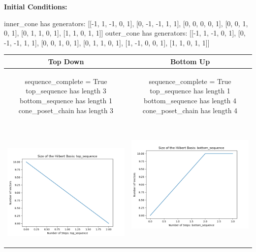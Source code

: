 \documentclass[10pt]{article}
\begin{document}
\textbf{Initial Conditions:}
\begin{SAGE}
inner_cone has generators: 
[[-1, 1, -1, 0, 1], [0, -1, -1, 1, 1], [0, 0, 0, 0, 1], [0, 0, 1, 0, 1], [0, 1, 1, 0, 1], [1, 1, 0, 1, 1]]
outer_cone has generators: 
[[-1, 1, -1, 0, 1], [0, -1, -1, 1, 1], [0, 0, 1, 0, 1], [0, 1, 1, 0, 1], [1, -1, 0, 0, 1], [1, 1, 0, 1, 1]]

\end{SAGE}
\begin{tabular}{c|c}
\textbf{Top Down} & \textbf{Bottom Up} \\ \hline  
\begin{SAGE}
	sequence_complete = True
	top_sequence has length 3
	bottom_sequence has length 1
	cone_poset_chain has length 3
\end{SAGE} 
&
\begin{SAGE}
	sequence_complete = True
	top_sequence has length 1
	bottom_sequence has length 4
	cone_poset_chain has length 4
\end{SAGE} 
\\ \hline
\
\begin{minipage}{.45\textwidth}
\includegraphics[width=\textwidth]{"DATA/5d/6 generators 1 bound G/top_sequence SIZE"}
\end{minipage} &
\begin{minipage}{.45\textwidth}
\includegraphics[width=\textwidth]{"DATA/5d/6 generators 1 bound G bottomup/bottom_sequence SIZE"}

\end{minipage}
\end{tabular}
\end{document}
